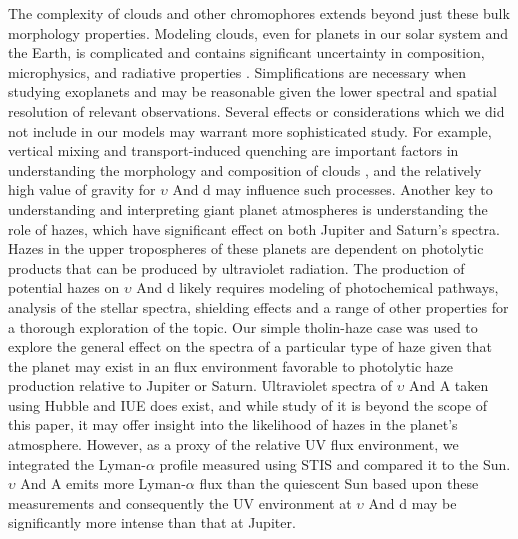\documentclass[12pt, letterpaper]{aastex631}
\begin{document}
The complexity of clouds and other chromophores extends beyond just these bulk morphology properties.  Modeling clouds, even for planets in our solar system and the Earth, is complicated and contains significant uncertainty in composition, microphysics, and radiative properties \citep{2013cctp.book..367M}. Simplifications are necessary when studying exoplanets and may be reasonable given the lower spectral and spatial resolution of relevant observations.  Several effects or considerations which we did not include in our models may warrant more sophisticated study. For example, vertical mixing and transport-induced quenching are important factors in understanding the morphology and composition of clouds \citep{2013cctp.book..367M}, and the relatively   
high value of gravity for $\upsilon$ And d may influence such processes. Another key to understanding and interpreting giant planet atmospheres is understanding the role of hazes, which have significant effect on both Jupiter and Saturn's spectra. Hazes in the upper tropospheres of these planets are dependent on photolytic products that can be produced by ultraviolet radiation. The production of potential hazes on $\upsilon$ And d likely requires modeling of photochemical pathways, analysis of the stellar spectra, shielding effects and a range of other properties for a thorough exploration of the topic.  Our simple tholin-haze case was used to explore the general effect on the spectra of a particular type of haze given that the planet may exist in an flux environment favorable to photolytic haze production relative to Jupiter or Saturn.  Ultraviolet spectra of $\upsilon$ And A taken using Hubble and IUE does exist, and while study of it is beyond the scope of this paper, it may offer insight into the likelihood of hazes in the planet's atmosphere.  However, as a proxy of the relative UV flux environment, we integrated the Lyman-$\alpha$ profile measured \citep{2019ApJ...880..117E} using STIS and compared it to the Sun. $\upsilon$ And A emits more Lyman-$\alpha$ flux than the quiescent Sun \citep{2013ApJ...766...69L} based upon these measurements and consequently the UV environment at $\upsilon$ And d may be significantly more intense than that at Jupiter. 

\end{document}
